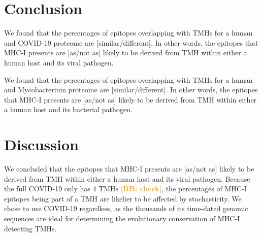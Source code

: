 \documentclass{article}
\newcommand{\richel}[1]{\textcolor{orange}{\textbf{[RB: #1]}}}
\begin{document}



\section{Conclusion}

We found that the percentages of epitopes overlapping 
with TMHs for a human and COVID-19 proteome are 
[similar/different]. In other words, the
epitopes that MHC-I presents are [as/not as] likely 
to be derived from TMH within either a human host and its viral pathogen.

We found that the percentages of epitopes overlapping 
with TMHs for a human and Mycobacterium proteome are 
[similar/different]. In other words, the
epitopes that MHC-I presents are [as/not as] likely 
to be derived from TMH within either a human host and its bacterial pathogen.



\section{Discussion}

We concluded that the
epitopes that MHC-I presents are [as/not as] likely 
to be derived from TMH within either a human host and its viral pathogen.
Because the full COVID-19 only has 4 TMHs \richel{check}, the percentages
of MHC-I epitopes being part of a TMH are likelier to be affected by
stochasticity. We chose to use COVID-19 regardless, as the thousands
of its time-dated genomic sequences are ideal for determining the 
evolutionary conservation of MHC-I detecting TMHs. 
\end{document}
